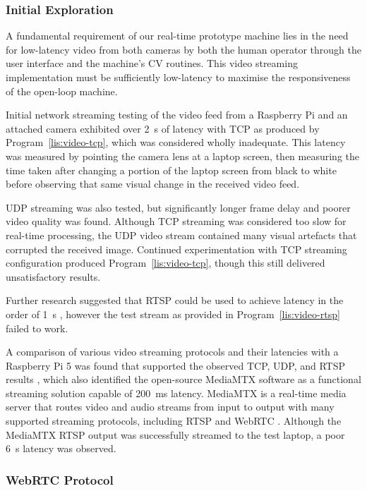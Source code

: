 \documentclass[12pt,british,UKenglish]{article}
\begin{document}
\subsubsection{Initial Exploration}

A fundamental requirement of our real-time prototype machine lies in the need for low-latency video from both cameras by both the human operator through the user interface and the machine's \ac{CV} routines.
This video streaming implementation must be sufficiently low-latency to maximise the responsiveness \cite{Z.2022} of the open-loop machine.

Initial network streaming testing of the video feed from a Raspberry Pi and an attached camera exhibited over \qty{2}{\second} of latency with \ac{TCP} as produced by Program~\ref{lis:video-tcp}, which was considered wholly inadequate.
This latency was measured by pointing the camera lens at a laptop screen, then measuring the time taken after changing a portion of the laptop screen from black to white before observing that same visual change in the received video feed.

UDP streaming was also tested, but significantly longer frame delay and poorer video quality was found.
Although \ac{TCP} streaming was considered too slow for real-time processing, the \ac{UDP} video stream contained many visual artefacts that corrupted the received image.
Continued experimentation with \ac{TCP} streaming configuration produced Program~\ref{lis:video-tcp}, though this still delivered unsatisfactory results.

Further research suggested that \ac{RTSP} could be used to achieve latency in the order of \qty{1}{\second} \cite{codecalamityRaspberryStreaming}, however the test stream as provided in Program~\ref{lis:video-rtsp} failed to work.

A comparison of various video streaming protocols and their latencies with a Raspberry Pi 5 was found that supported the observed \ac{TCP}, \ac{UDP}, and \ac{RTSP} results \cite{mediumRaspberryVideo}, which also identified the open-source MediaMTX software as a functional streaming solution capable of \qty{200}{\milli\second} latency.
MediaMTX is a real-time media server that routes video and audio streams from input to output with many supported streaming protocols, including \ac{RTSP} and \ac{WebRTC} \cite{mediamtx}.
Although the MediaMTX \ac{RTSP} output was successfully streamed to the test laptop, a poor \qty{6}{\second} latency was observed.

\subsubsection{\acf*{WebRTC} Protocol}\label{sec:WebRTC-Video-Streaming}
\end{document}

